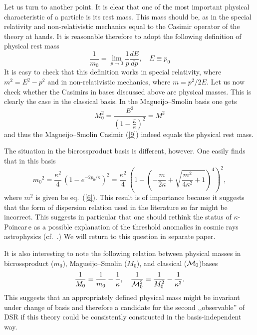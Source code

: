 \documentclass[a4paper,a4paper]{article}
\begin{document}
Let us turn to another point. It is clear that one of the most
important physical characteristic of a  particle is its rest mass.
This mass should be, as in the special relativity and
non-relativistic mechanics equal to the Casimir operator of the
theory at hands. It is reasonable therefore to adopt the following
definition of physical rest mass
\begin{equation}\label{24}
  \frac{1}{m_{0}}=\lim_{p\rightarrow0}\frac{1}{p}\frac{dE}{dp}, \quad E \equiv p_0
\end{equation}
 It is easy to check that this definition
works in special relativity, where $m^2 = E^2 - p^2$ and in
non-relativistic mechanics, where $m = p^2/2E$. Let us now check
whether the Casimirs in bases discussed above are  physical
masses. This is clearly the case in the classical basis. In the
Magueijo--Smolin basis one gets
$$
{M_0^2} = \frac{E^2}{\left(1-\frac E\kappa\right)^2} = M^2
$$
and thus the Magueijo--Smolin Casimir (\ref{9}) indeed equals the physical rest mass.

The situation in the bicrossproduct basis is different, however. One easily finds that in this basis
\begin{equation}\label{25}
{m_{0}}^2=\frac{\kappa^2}{4}\, \left(1-e^{-2p_0/\kappa}\right)^2
=\frac{\kappa^2}{4}\, \left(1-\left(-\frac{m}{2\kappa} +
\sqrt{\frac{m^2}{4\kappa^2} +1}\right)^4\right)^2,
\end{equation}
where $m^2$ is given be eq.~(\ref{6}). This result is of
importance because it suggests that the form of dispersion
relation used in the literature so far might be incorrect. This
suggests in particular that one should rethink the status of
$\kappa$-Poincar\,e as a possible explanation of the threshold
anomalies in cosmic rays astrophysics (cf.~\cite{gacpir}.) We will
return to this question in separate paper.

It is also interesting to note the following relation between
physical masses in bicrossproduct ($m_0$), Magueijo--Smolin
($M_0$), and classical (${\cal M}_0$)bases
\begin{equation}\label{26}
  \frac1{M_0} = \frac1{m_0} - \frac1\kappa, \quad \frac1{{\cal M}^2_0} = \frac1{M^2_0} -
  \frac1{\kappa^2}.
\end{equation}
This suggests that an appropriately defined physical mass might be
invariant under change of basis and therefore a candidate for the
second ,,observable'' of DSR if this theory could be consistently
constructed in the basis-independent way.
\end{document}
